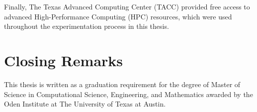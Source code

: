 Finally, The Texas Advanced Computing Center (TACC) provided free access to advanced 
High-Performance Computing (HPC) resources, which were used throughout the experimentation process in this thesis.

\section{Closing Remarks}

This thesis is written as a graduation requirement for the degree of Master of Science in
Computational Science, Engineering, and Mathematics awarded by the Oden Institute at 
The University of Texas at Austin.

\vspace{5mm}

